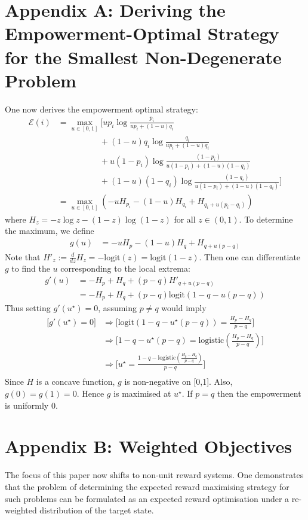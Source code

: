 \documentclass{article}
\newcommand{\Ee}{\mathcal{E}}
\begin{document}
\section*{Appendix A: Deriving the Empowerment-Optimal Strategy for the Smallest Non-Degenerate Problem}
One now derives the empowerment optimal strategy: 
\begin{align*}
\Ee(i) 
	&= \max_{u\in [0,1]}\bigg[up_i \log \frac{p_i}{up_i+(1-u)q_i}\\
	&\hspace{5em} + (1-u)q_i \log \frac{q_i}{up_i+(1-u)q_i}\\
	&\hspace{5em} + u(1-p_i) \log \frac{(1-p_i)}{u(1-p_i)+(1-u)(1-q_i)}\\
	&\hspace{5em} + (1-u)(1-q_i) \log \frac{(1-q_i)}{u(1-p_i)+(1-u)(1-q_i)}\bigg]\\
	&=\max_{u\in [0,1]}\left(-uH_{p_i}-(1-u)H_{q_i}+H_{q_i+u(p_i-q_i)}\right)
\end{align*}
where $H_z=-z\log z - (1-z)\log(1-z)$ for all $z\in (0,1)$. To determine the maximum, we define 
\begin{align*}
g(u)&= -uH_{p}-(1-u)H_{q}+H_{q+u(p-q)} 
\end{align*}
Note that $H'_z:=\frac{d}{dz} H_z= -\text{logit}(z)=\text{logit}(1-z)$.
Then one can differentiate $g$ to find the $u$ corresponding to the local extrema:
\begin{align*}
g'(u) 
	&= -H_p + H_q + (p-q)H'_{q+u(p-q)}\\
	&= -H_p + H_q +(p-q)\text{logit}(1-q-u(p-q))
\end{align*}
Thus setting $g'(u^\star)=0$, assuming $p\neq q$ would imply
\begin{align*}
\bigg[g'(u^\star)=0\bigg]
	&\Rightarrow\bigg[\text{logit}(1-q-u^\star(p-q)) = \frac{H_{p}-H_{q}}{p-q}\bigg]\\
	&\Rightarrow\bigg[1-q-u^\star(p-q) = \text{logistic}\left(\frac{H_{p}-H_{q}}{p-q}\right)\bigg]\\
	&\Rightarrow\bigg[u^\star=\frac{1-q-\text{logistic}\left(\frac{H_{p}-H_{q}}{p-q}\right)}{p-q} \bigg]\\
\end{align*}
Since $H$ is a concave function, $g$ is non-negative on [0,1]. Also, $g(0)=g(1)=0$. Hence $g$ is maximised at $u^\star$. If $p=q$ then the empowerment is uniformly $0$.

\newpage
\section*{Appendix B: Weighted Objectives}
The focus of this paper now shifts to non-unit reward systems. One demonstrates that the problem of determining the expected reward maximising strategy for such problems can be formulated as an expected reward optimisation under a re-weighted distribution of the target state.\vspace{1em}
\end{document}
